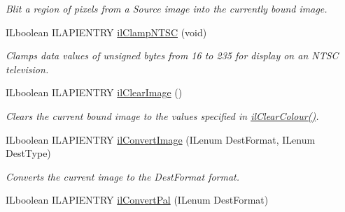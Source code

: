 \begin{DoxyCompactItemize}
\begin{DoxyCompactList}\small\item\em Blit a region of pixels from a {\itshape Source} image into the currently bound image. \end{DoxyCompactList}\item 
I\+Lboolean I\+L\+A\+P\+I\+E\+N\+T\+R\+Y \hyperlink{group__image__manip_gab2c623d693bf0f5c2f046a64af7b22ba}{il\+Clamp\+N\+T\+S\+C} (void)
\begin{DoxyCompactList}\small\item\em Clamps data values of unsigned bytes from 16 to 235 for display on an N\+T\+S\+C television. \end{DoxyCompactList}\item 
\hypertarget{group__image__manip_gae48d76d54f6f00fe54b304c29224653f}{I\+Lboolean I\+L\+A\+P\+I\+E\+N\+T\+R\+Y \hyperlink{group__image__manip_gae48d76d54f6f00fe54b304c29224653f}{il\+Clear\+Image} ()}\label{group__image__manip_gae48d76d54f6f00fe54b304c29224653f}

\begin{DoxyCompactList}\small\item\em Clears the current bound image to the values specified in \hyperlink{group__state_gaca1dc7f7b8e61eb134060c9c8a8b72f2}{il\+Clear\+Colour()}. \end{DoxyCompactList}\item 
I\+Lboolean I\+L\+A\+P\+I\+E\+N\+T\+R\+Y \hyperlink{group__image__manip_ga82b125402ed12ed399f181165374a7c1}{il\+Convert\+Image} (I\+Lenum Dest\+Format, I\+Lenum Dest\+Type)
\begin{DoxyCompactList}\small\item\em Converts the current image to the Dest\+Format format. \end{DoxyCompactList}\item 
\hypertarget{group__image__manip_gaf3e055a50d9dcc791b249bfd6152ba58}{I\+Lboolean I\+L\+A\+P\+I\+E\+N\+T\+R\+Y \hyperlink{group__image__manip_gaf3e055a50d9dcc791b249bfd6152ba58}{il\+Convert\+Pal} (I\+Lenum Dest\+Format)}\label{group__image__manip_gaf3e055a50d9dcc791b249bfd6152ba58}


\end{DoxyCompactItemize}
